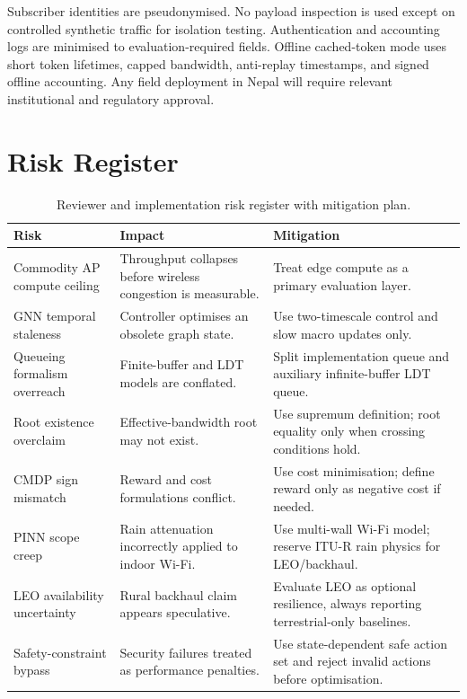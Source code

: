 Subscriber identities are pseudonymised. No payload inspection is used except on
controlled synthetic traffic for isolation testing. Authentication and accounting logs are
minimised to evaluation-required fields. Offline cached-token mode uses short token
lifetimes, capped bandwidth, anti-replay timestamps, and signed offline accounting. Any
field deployment in Nepal will require relevant institutional and regulatory approval.

\section{Risk Register}
\label{sec:risks}

\begin{table}[H]
\centering
\caption{Reviewer and implementation risk register with mitigation plan.}
\label{tab:risks}
\begin{tabularx}{\textwidth}{lXX}
\toprule
\textbf{Risk} & \textbf{Impact} & \textbf{Mitigation} \\
\midrule
Commodity AP compute ceiling & Throughput collapses before wireless congestion is measurable. & Treat edge compute as a primary evaluation layer. \\
GNN temporal staleness & Controller optimises an obsolete graph state. & Use two-timescale control and slow macro updates only. \\
Queueing formalism overreach & Finite-buffer and LDT models are conflated. & Split implementation queue and auxiliary infinite-buffer LDT queue. \\
Root existence overclaim & Effective-bandwidth root may not exist. & Use supremum definition; root equality only when crossing conditions hold. \\
CMDP sign mismatch & Reward and cost formulations conflict. & Use cost minimisation; define reward only as negative cost if needed. \\
PINN scope creep & Rain attenuation incorrectly applied to indoor Wi-Fi. & Use multi-wall Wi-Fi model; reserve ITU-R rain physics for LEO/backhaul. \\
LEO availability uncertainty & Rural backhaul claim appears speculative. & Evaluate LEO as optional resilience, always reporting terrestrial-only baselines. \\
Safety-constraint bypass & Security failures treated as performance penalties. & Use state-dependent safe action set and reject invalid actions before optimisation. \\
\bottomrule
\end{tabularx}
\end{table}


